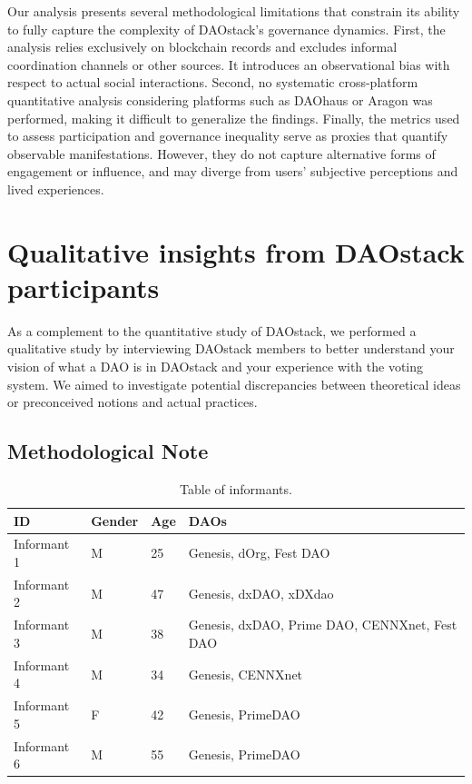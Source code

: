 \documentclass[10pt,lineno]{wlpeerj}
\begin{document}
Our analysis presents several methodological limitations that constrain its ability to fully capture the complexity of DAOstack’s governance dynamics. First, the analysis relies exclusively on blockchain records and excludes informal coordination channels or other sources. It introduces an observational bias with respect to actual social interactions. Second, no systematic cross-platform quantitative analysis considering platforms such as DAOhaus or Aragon was performed, making it difficult to generalize the findings. Finally, the metrics used to assess participation and governance inequality serve as proxies that quantify observable manifestations. However, they do not capture alternative forms of engagement or influence, and may diverge from users’ subjective perceptions and lived experiences.





\section{Qualitative insights from DAOstack participants}

As a complement to the quantitative study of DAOstack, we performed a qualitative study by interviewing DAOstack members to better understand your vision of what a DAO is in DAOstack and your experience with the voting system. We aimed to investigate potential discrepancies between theoretical ideas or preconceived notions and actual practices.



\subsection{Methodological Note}

\begin{table}[t]
    \centering
    \newcommand{\mypc}[1]{\hfill(\SI{#1}{\percent})}

    \begin{tabular}{
    l %
    l %
    l %
    l %
    }
\toprule
ID & Gender & Age & DAOs \\
\midrule
Informant 1 & M & 25 & Genesis, dOrg, Fest DAO \\
Informant 2 & M & 47 & Genesis, dxDAO, xDXdao \\
Informant 3 & M & 38 & Genesis, dxDAO, Prime DAO, CENNXnet, Fest DAO \\
Informant 4 & M & 34 & Genesis, CENNXnet \\
Informant 5 & F & 42 & Genesis, PrimeDAO \\
Informant 6 & M & 55 & Genesis, PrimeDAO \\
\bottomrule
\end{tabular}

    \caption{Table of informants.}
    \label{tab:informants}
\end{table}
\end{document}
